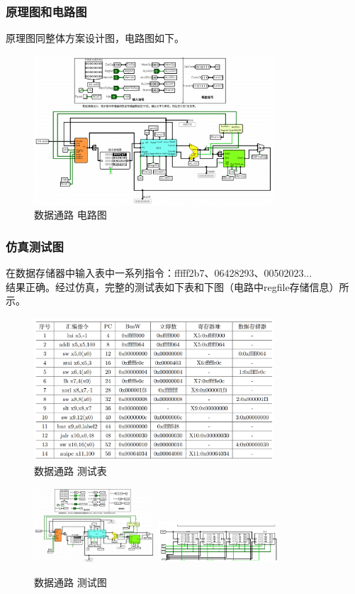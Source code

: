 \documentclass{article}
\begin{document}
    \subsubsection{原理图和电路图}
    原理图同整体方案设计图，电路图如下。

    \begin{figure}[H]
    \centering
    \includegraphics[width=0.8\textwidth]{7.4.2.png}
    \caption{数据通路 电路图}
    \end{figure}

    \subsubsection{仿真测试图}
    在数据存储器中输入表中一系列指令：fffff2b7、06428293、00502023...\\
    结果正确。经过仿真，完整的测试表如下表和下图（电路中regfile存储信息）所示。
    \begin{figure}[H]
        \centering
        \includegraphics[width=0.8\textwidth]{7.5.png}
        \caption{数据通路 测试表}
    \end{figure}

    \begin{figure}[H]
        \centering
        \includegraphics[width=0.4\textwidth]{7.5.1.png}
        \includegraphics[width=0.4\textwidth]{7.5.2.png}
        \caption{数据通路 测试图}
    \end{figure}
\end{document}
